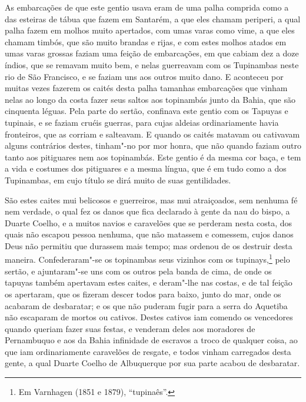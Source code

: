 \begin{linenumbers}
As embarcações de que este gentio usava eram de uma palha comprida como a das esteiras de
tábua que fazem em Santarém, a que eles chamam periperi, a qual palha fazem em molhos
muito apertados, com umas varas como vime, a que eles chamam timbós, que são muito brandas
e rijas, e com estes molhos atados em umas varas grossas faziam uma feição de embarcações,
em que cabiam dez a doze índios, que se remavam muito bem, e nelas guerreavam com os
Tupinambas neste rio de São Francisco, e se faziam uns aos outros muito dano. E aconteceu
por muitas vezes fazerem os caités desta palha tamanhas embarcações que vinham nelas ao
longo da costa fazer seus saltos aos topinambás junto da Bahia, que são cinquenta léguas.
Pela parte do sertão, confinava este gentio com os Tapuyas e tupinais, e se faziam cruéis
guerras, para cujas aldeias ordinariamente havia fronteiros, que as corriam e salteavam. E
quando os caités matavam ou cativavam alguns contrários destes, tinham"-no por mor honra,
que não quando faziam outro tanto aos pitiguares nem aos topinambás. Este gentio é da
mesma cor baça, e tem a vida e costumes dos pitiguares e a mesma língua, que é em tudo
como a dos Tupinambas, em cujo título se dirá muito de suas gentilidades.

São estes caites mui belicosos e guerreiros, mas mui atraiçoados, sem nenhuma fé nem
verdade, o qual fez os danos que fica declarado à gente da nau do bispo, a Duarte Coelho,
e a muitos navios e caravelões que se perderam nesta costa, dos quais não escapou pessoa
nenhuma, que não matassem e comessem, cujos danos Deus não permitiu que durassem mais
tempo; mas ordenou de os destruir desta maneira. Confederaram"-se os topinambas seus
vizinhos com os tupinays,\footnote{ Em Varnhagen (1851 e 1879), ``tupinaês''.} pelo
sertão, e ajuntaram"-se uns com os outros pela banda de cima, de onde os tapuyas também
apertavam estes caites, e deram"-lhe nas costas, e de tal feição os apertaram, que os
fizeram descer todos para baixo, junto do mar, onde os acabaram de desbaratar; e os que
não puderam fugir para a serra do Aquetiba não escaparam de mortos ou cativos. Destes
cativos iam comendo os vencedores quando queriam fazer suas festas, e venderam deles aos
moradores de Pernambuquo e aos da Bahia infinidade de escravos a troco de qualquer coisa,
ao que iam ordinariamente caravelões de resgate, e todos vinham carregados desta gente, a
qual Duarte Coelho de Albuquerque por sua parte acabou de desbaratar.


\end{linenumbers}
